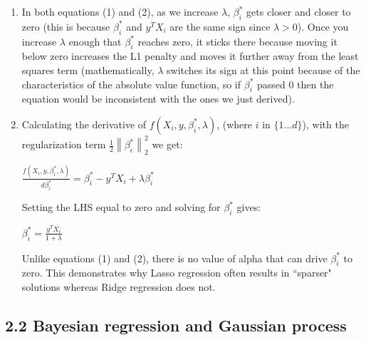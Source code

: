 \documentclass{article}
\newcommand{\norm}[1]{\left\lVert#1\right\rVert}
\begin{document}
\begin{enumerate}
\item %

In both equations (1) and (2), as we increase $\lambda$, $\beta_i^\ast$ gets closer and closer to zero
(this is because $\beta_i^\ast$ and $y^TX_i$ are the same sign since $\lambda > 0$).
Once you increase $\lambda$ enough that $\beta_i^\ast$ reaches zero, it sticks there because moving it below zero
increases the L1 penalty and moves it further away from the least squares term (mathematically, $\lambda$ switches
its sign at this point because of the characteristics of the absolute value function, so if $\beta_i^\ast$ passed 0 then 
the equation would be inconsistent with the ones we just derived). 

\item %

Calculating the derivative of $f(X_i,y,\beta_i^\ast,\lambda)$, (where $i$ in $\{1...d\}$),
with the regularization term $\frac{1}{2}\norm{\beta_i^\ast}_2^2$ we get: 

$\frac{f(X_i,y,\beta_i^\ast,\lambda)}{d\beta_i^\ast}=\beta_i^\ast-y^TX_i+\lambda\beta_i^\ast$

Setting the LHS equal to zero and solving for $\beta_i^\ast$ gives:

$\beta_i^\ast=\frac{y^TX_i}{1+\lambda}$

Unlike equations (1) and (2), there is no value of alpha that can drive $\beta_i^\ast$ to zero.
This demonstrates why Lasso regression often results in ``sparser" solutions whereas Ridge regression
does not.

\end{enumerate}
\subsection*{2.2 Bayesian regression and Gaussian process}
\end{document}
